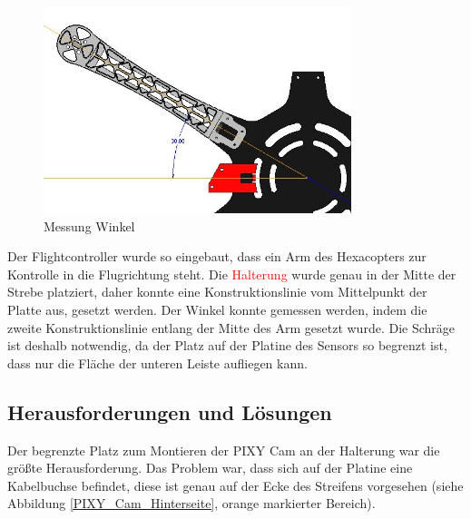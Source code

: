 			\begin{figure}[tbh]
			\begin{centering}
			\includegraphics[width = 0.8\textwidth]{Bilder/winkel_pixy}
			\par\end{centering}
			\caption{Messung Winkel}
			\label{winkel_pixy}
			\end{figure}

	Der Flightcontroller wurde so eingebaut, dass ein Arm des Hexacopters zur Kontrolle in die Flugrichtung steht.
	Die \textcolor{red}{Halterung} wurde genau in der Mitte der Strebe platziert, daher konnte eine Konstruktionslinie vom Mittelpunkt der Platte aus, gesetzt werden.
	Der Winkel konnte gemessen werden, indem die zweite Konstruktionslinie entlang der Mitte des Arm gesetzt wurde.
	Die Schräge ist deshalb notwendig, da der Platz auf der Platine des Sensors so begrenzt ist, dass nur die Fläche der unteren Leiste aufliegen kann.

	\subsection{Herausforderungen und Lösungen}

	Der begrenzte Platz zum Montieren der PIXY Cam an der Halterung war die größte Herausforderung.
	Das  Problem war, dass sich auf der Platine eine Kabelbuchse befindet, diese ist genau auf der Ecke des Streifens vorgesehen (siehe Abbildung \ref{PIXY_Cam_Hinterseite}, orange markierter Bereich).

